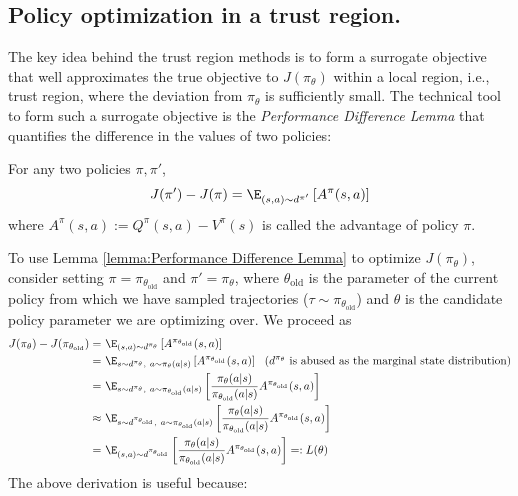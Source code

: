\subsection{Policy optimization in a trust region.}
The key idea behind the trust region methods is to form a surrogate objective that well approximates the true objective to $J(\pi_\theta)$ within a local region, i.e., trust region, where the deviation from $\pi_\theta$ is sufficiently small.
The technical tool to form such a surrogate objective is the {\em Performance Difference Lemma} that quantifies the difference in the values of two policies:
\begin{lemma}
\label{lemma:Performance Difference Lemma}
For any two policies $\pi, \pi'$,
\begin{align*}
    J(\pi') - J(\pi) = \E_{{(s,a)}\sim d^{\pi'}}\left[A^\pi(s,a)\right]
\end{align*}
where $A^\pi(s,a):= Q^\pi(s,a)-V^\pi(s)$ is called the advantage of policy $\pi$.
\end{lemma}
To use Lemma \ref{lemma:Performance Difference Lemma} to optimize $J(\pi_\theta)$, consider setting $\pi=\pi_{\theta_{\text{old}}}$ and $\pi'=\pi_\theta$,
where $\theta_{\text{old}}$ is the parameter of the current policy from which we have sampled trajectories ($\tau\sim\pi_{\theta_{\text{old}}}$) and $\theta$ is the candidate policy parameter we are optimizing over.
We proceed as 
\begin{align*}
    J(\pi_\theta) - J(\pi_{\theta_{\text{old}}})=&~ \E_{(s,a)\sim d^{\pi_\theta}}\left[A^{\pi_{\theta_{\text{old}}}}(s,a)\right]\\
    =&~\E_{s\sim d^{\pi_\theta},~ a\sim\pi_\theta(a|s)}\left[A^{\pi_{\theta_{\text{old}}}}(s,a)\right]
    ~~\text{($d^{\pi_\theta}$ is abused as the marginal state distribution)}\\
    =&~\E_{s\sim d^{\pi_\theta},~ a\sim\pi_{\theta_{\text{old}}}(a|s)}\left[\frac{\pi_\theta(a|s)}{\pi_{\theta_{\text{old}}}(a|s)}A^{\pi_{\theta_{\text{old}}}}(s,a)\right]\\
    \approx&~\E_{s\sim d^{\pi_{\theta_{\text{old}}}},~ a\sim\pi_{\theta_{\text{old}}}(a|s)}\left[\frac{\pi_\theta(a|s)}{\pi_{\theta_{\text{old}}}(a|s)}A^{\pi_{\theta_{\text{old}}}}(s,a)\right]\\
    =&~ \E_{(s,a)\sim d^{\pi_{\theta_{\text{old}}}}}\left[\frac{\pi_\theta(a|s)}{\pi_{\theta_{\text{old}}}(a|s)}A^{\pi_{\theta_{\text{old}}}}(s,a)\right] =: L(\theta)
\end{align*}
The above derivation is useful because:
